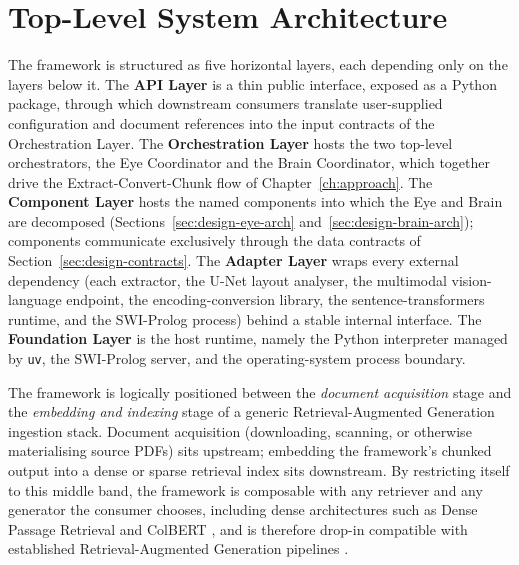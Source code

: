 \documentclass[12pt,a4paper,oneside]{report}
\begin{document}
\section{Top-Level System Architecture}
\label{sec:design-toplevel}
The framework is structured as five horizontal layers, each depending only on the layers below it. The \textbf{API Layer} is a thin public interface, exposed as a Python package, through which downstream consumers translate user-supplied configuration and document references into the input contracts of the Orchestration Layer. The \textbf{Orchestration Layer} hosts the two top-level orchestrators, the Eye Coordinator and the Brain Coordinator, which together drive the Extract-Convert-Chunk flow of Chapter~\ref{ch:approach}. The \textbf{Component Layer} hosts the named components into which the Eye and Brain are decomposed (Sections~\ref{sec:design-eye-arch} and~\ref{sec:design-brain-arch}); components communicate exclusively through the data contracts of Section~\ref{sec:design-contracts}. The \textbf{Adapter Layer} wraps every external dependency (each extractor, the U-Net layout analyser, the multimodal vision-language endpoint, the encoding-conversion library, the sentence-transformers runtime, and the SWI-Prolog process) behind a stable internal interface. The \textbf{Foundation Layer} is the host runtime, namely the Python interpreter managed by \texttt{uv}, the SWI-Prolog server, and the operating-system process boundary.

The framework is logically positioned between the \textit{document acquisition} stage and the \textit{embedding and indexing} stage of a generic Retrieval-Augmented Generation ingestion stack. Document acquisition (downloading, scanning, or otherwise materialising source PDFs) sits upstream; embedding the framework's chunked output into a dense or sparse retrieval index sits downstream. By restricting itself to this middle band, the framework is composable with any retriever and any generator the consumer chooses, including dense architectures such as Dense Passage Retrieval \cite{karpukhin2020dpr} and ColBERT \cite{khattab2020colbert}, and is therefore drop-in compatible with established Retrieval-Augmented Generation pipelines \cite{lewis2020rag}.
\end{document}
